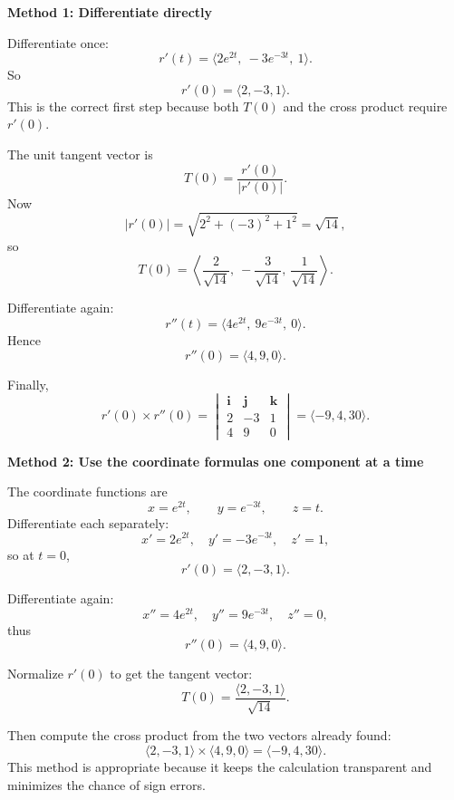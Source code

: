 \documentclass[a4paper,12pt,twocolumn]{article}
\newenvironment{solutionbox}{\begin{framed}}{\end{framed}}
\begin{document}
\begin{solutionbox}
\textbf{Method 1: Differentiate directly}

\begin{steps}
\item Differentiate once:
\[
r'(t)=\langle 2e^{2t},\ -3e^{-3t},\ 1\rangle.
\]
So
\[
r'(0)=\langle 2,-3,1\rangle.
\]
This is the correct first step because both \(T(0)\) and the cross product require \(r'(0)\).

\item The unit tangent vector is
\[
T(0)=\frac{r'(0)}{|r'(0)|}.
\]
Now
\[
|r'(0)|=\sqrt{2^2+{(-3)}^2+1^2}=\sqrt{14},
\]
so
\[
T(0)=\left\langle \frac{2}{\sqrt{14}},\ -\frac{3}{\sqrt{14}},\ \frac{1}{\sqrt{14}}\right\rangle.
\]

\item Differentiate again:
\[
r''(t)=\langle 4e^{2t},\ 9e^{-3t},\ 0\rangle.
\]
Hence
\[
r''(0)=\langle 4,9,0\rangle.
\]

\item Finally,
\[
r'(0)\times r''(0)
=
\begin{vmatrix}
\mathbf i & \mathbf j & \mathbf k\\
2 & -3 & 1\\
4 & 9 & 0
\end{vmatrix}
=\langle -9,4,30\rangle.
\]
\end{steps}
\end{solutionbox}

\begin{solutionbox}
\textbf{Method 2: Use the coordinate formulas one component at a time}

\begin{steps}
\item The coordinate functions are
\[
x=e^{2t},\qquad y=e^{-3t},\qquad z=t.
\]
Differentiate each separately:
\[
x'=2e^{2t},\quad y'=-3e^{-3t},\quad z'=1,
\]
so at \(t=0\),
\[
r'(0)=\langle 2,-3,1\rangle.
\]

\item Differentiate again:
\[
x''=4e^{2t},\quad y''=9e^{-3t},\quad z''=0,
\]
thus
\[
r''(0)=\langle 4,9,0\rangle.
\]

\item Normalize \(r'(0)\) to get the tangent vector:
\[
T(0)=\frac{\langle 2,-3,1\rangle}{\sqrt{14}}.
\]

\item Then compute the cross product from the two vectors already found:
\[
\langle 2,-3,1\rangle\times \langle 4,9,0\rangle
=\langle -9,4,30\rangle.
\]
This method is appropriate because it keeps the calculation transparent and minimizes the chance of sign errors.
\end{steps}
\end{solutionbox}
\end{document}
